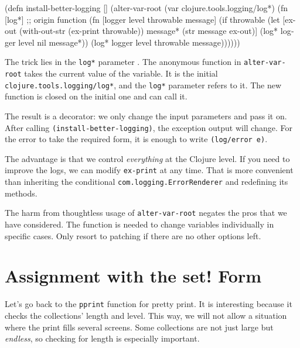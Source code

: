 \else

\begin{english}
  \begin{clojure/lines}
(defn install-better-logging []
  (alter-var-root
   (var clojure.tools.logging/log*)
   (fn [log*] ;; origin function
     (fn [logger level throwable message]
       (if throwable
         (let [ex-out (with-out-str (ex-print throwable))
               message* (str message \newline ex-out)]
           (log* logger level nil message*))
         (log* logger level throwable message))))))
  \end{clojure/lines}
\end{english}

\fi

\mnoindent
The trick lies in the \verb|log*| parameter . The anonymous function in \verb|alter-var-root| takes the current value of the variable. It is the initial \verb|clojure.tools.logging/log*|, and the \verb|log*| parameter refers to it.
The new function is closed on the initial one and can call it.

The result is a decorator: we only change the input parameters and pass it on. After calling \verb|(install-better-logging)|, the exception output will change. 
For the error to take the required form, it is enough to write \verb|(log/error e)|.

The advantage is that we control \emph{everything} at the Clojure level.
If you need to improve the logs, we can modify \verb|ex-print| at any time.
That is more convenient than inheriting the conditional \verb|com.logging.ErrorRenderer| and redefining its methods.

The harm from thoughtless usage of \verb|alter-var-root| negates the pros that we have considered.
The function is needed to change variables individually in specific cases.
Only resort to patching if there are no other options left.

\section{Assignment with the set! Form}


Let's go back to the \verb|pprint| function for pretty print. It is interesting because it checks the collections' length and level.
This way, we will not allow a situation where the print fills several screens.
Some collections are not just large but \emph{endless}, so checking for length is especially important.

